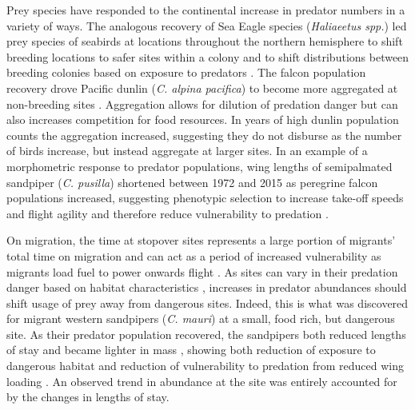 Prey species have responded to the continental increase in predator numbers in a variety of ways. The analogous recovery of Sea Eagle species (\textit{Haliaeetus spp.}) led prey species of seabirds at locations throughout the northern hemisphere to shift breeding locations to safer sites within a colony and to shift distributions between breeding colonies based on exposure to predators \citep{MarkHipfner2012}. The falcon population recovery drove Pacific dunlin (\textit{C. alpina pacifica}) to become more aggregated at non-breeding sites \citep{Xu2015b,Ydenberg2017}. Aggregation allows for dilution of predation danger but can also increases competition for food resources. In years of high dunlin population counts the aggregation increased, suggesting they do not disburse as the number of birds increase, but instead aggregate at larger sites. In an example of a morphometric response to predator populations, wing lengths of semipalmated sandpiper (\textit{C. pusilla}) shortened between 1972 and 2015 as peregrine falcon populations increased, suggesting phenotypic selection to increase take-off speeds and flight agility and therefore reduce vulnerability to predation \citep{Lank2017}.

On migration, the time at stopover sites represents a large portion of migrants' total time on migration \citep{Hedenstrom1997} and can act as a period of increased vulnerability as migrants load fuel to power onwards flight \citep{Houston1998,Cimprich2005a}. As sites can vary in their predation danger based on habitat characteristics \citep{lank_ydenberg2003}, increases in predator abundances should shift usage of prey away from dangerous sites. Indeed, this is what was discovered for migrant western sandpipers (\textit{C. mauri}) at a small, food rich, but dangerous site. As their predator population recovered, the sandpipers both reduced lengths of stay and became lighter in mass \citep{ydenberg_western_2004}, showing both reduction of exposure to dangerous habitat and reduction of vulnerability to predation from reduced wing loading \citep{burns_effects_2002}. An observed trend in abundance at the site was entirely accounted for by the changes in lengths of stay. 

